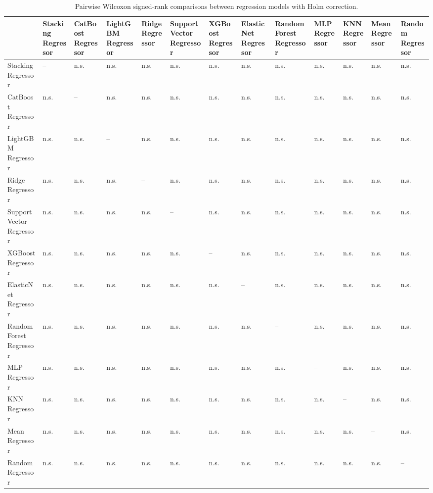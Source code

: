 \begin{table}
\caption{Pairwise Wilcoxon signed-rank comparisons between regression models with Holm correction.}
\label{tab:wilcoxon_pairwise_significance}
\begin{tabular}{lllllllllllll}
\toprule
 & Stacking Regressor & CatBoost Regressor & LightGBM Regressor & Ridge Regressor & Support Vector Regressor & XGBoost Regressor & ElasticNet Regressor & Random Forest Regressor & MLP Regressor & KNN Regressor & Mean Regressor & Random Regressor \\
\midrule
Stacking Regressor & -- & n.s. & n.s. & n.s. & n.s. & n.s. & n.s. & n.s. & n.s. & n.s. & n.s. & n.s. \\
CatBoost Regressor & n.s. & -- & n.s. & n.s. & n.s. & n.s. & n.s. & n.s. & n.s. & n.s. & n.s. & n.s. \\
LightGBM Regressor & n.s. & n.s. & -- & n.s. & n.s. & n.s. & n.s. & n.s. & n.s. & n.s. & n.s. & n.s. \\
Ridge Regressor & n.s. & n.s. & n.s. & -- & n.s. & n.s. & n.s. & n.s. & n.s. & n.s. & n.s. & n.s. \\
Support Vector Regressor & n.s. & n.s. & n.s. & n.s. & -- & n.s. & n.s. & n.s. & n.s. & n.s. & n.s. & n.s. \\
XGBoost Regressor & n.s. & n.s. & n.s. & n.s. & n.s. & -- & n.s. & n.s. & n.s. & n.s. & n.s. & n.s. \\
ElasticNet Regressor & n.s. & n.s. & n.s. & n.s. & n.s. & n.s. & -- & n.s. & n.s. & n.s. & n.s. & n.s. \\
Random Forest Regressor & n.s. & n.s. & n.s. & n.s. & n.s. & n.s. & n.s. & -- & n.s. & n.s. & n.s. & n.s. \\
MLP Regressor & n.s. & n.s. & n.s. & n.s. & n.s. & n.s. & n.s. & n.s. & -- & n.s. & n.s. & n.s. \\
KNN Regressor & n.s. & n.s. & n.s. & n.s. & n.s. & n.s. & n.s. & n.s. & n.s. & -- & n.s. & n.s. \\
Mean Regressor & n.s. & n.s. & n.s. & n.s. & n.s. & n.s. & n.s. & n.s. & n.s. & n.s. & -- & n.s. \\
Random Regressor & n.s. & n.s. & n.s. & n.s. & n.s. & n.s. & n.s. & n.s. & n.s. & n.s. & n.s. & -- \\
\bottomrule
\end{tabular}
\end{table}
